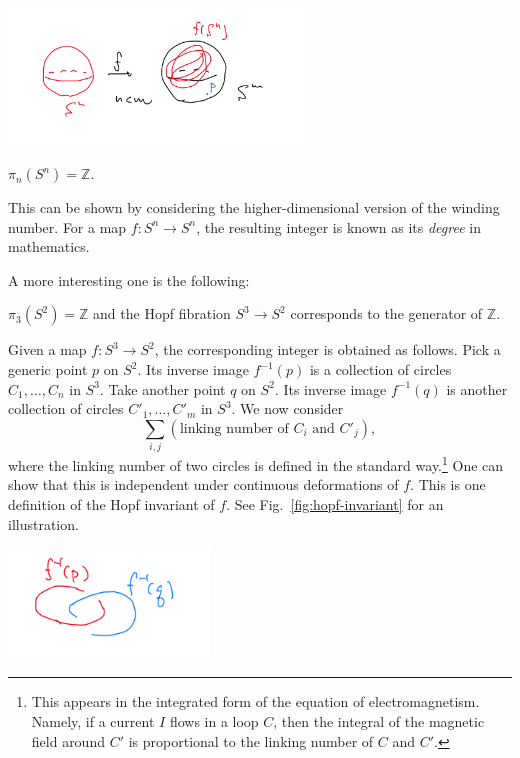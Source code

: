 \documentclass[12pt]{article}
\numberwithin{equation}{section}
\renewenvironment{figure}[1][]{
  \begin{originalfigure}[#1]
    \begin{mdframed}[linecolor=black!0,backgroundcolor=black!1]
}{
    \end{mdframed}
  \end{originalfigure}
}
\def\bZ{\mathbb{Z}}
\begin{document}
\begin{figure}
  \centering
  \includegraphics[width=0.6\textwidth]{nm}
  \caption{A generic map $S^n\to S^m$ with $n<m$ has a point $p\in S^m$ not mapped from $S^n$.}
  \label{fig:nm}
\end{figure}


\begin{theorem}
$\pi_n(S^n) =\bZ$.
\end{theorem}
This can be shown by considering 
the higher-dimensional version of the winding number.
For a map $f:S^n\to S^n$, 
the resulting integer is known as its \emph{degree} in mathematics.

A more interesting one is the following:
\begin{theorem}
  $\pi_3(S^2)=\bZ$ and the Hopf fibration $S^3\to S^2$ corresponds 
  to the generator of $\bZ$.
\end{theorem}



Given a map $f:S^3\to S^2$, the corresponding integer is obtained as follows.
Pick a generic point $p$ on $S^2$. 
Its inverse image $f^{-1}(p)$ is a collection of circles $C_1,\ldots, C_n$ in $S^3$.
Take another point $q$ on $S^2$.
Its inverse image $f^{-1}(q)$ is another collection of circles $C'_1,\ldots, C'_m$ in $S^3$.
We now consider \begin{equation}
\sum_{i,j} (\text{linking number of $C_i$ and $C'_j$}), \label{eq:Hopf-invariant-crude}
\end{equation}
where the linking number of two circles is defined in the standard way.\footnote{This appears in the integrated form of the equation of electromagnetism.
Namely, if a current $I$ flows in a loop $C$,
then the integral of the magnetic field around $C'$ 
is proportional to the linking number of $C$ and $C'$.}
One can show that this is independent under continuous deformations of $f$.
This is one definition of the Hopf invariant of $f$.
See Fig.~\ref{fig:hopf-invariant} for an illustration.

\begin{figure}
  \centering
  \includegraphics[width=0.4\textwidth]{hopf}
  \caption{A definition of the Hopf invariant of a map $f:S^3\to S^2$  is 
  given by considering the linking number of the inverse images of two points in $S^2$.}
  \label{fig:hopf-invariant}
\end{figure}
\end{document}
